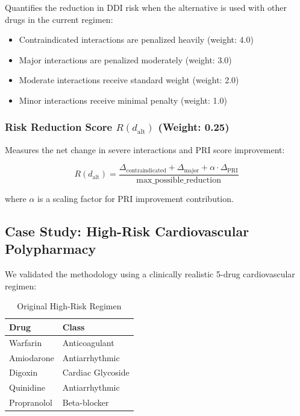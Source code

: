 \documentclass[11pt,a4paper]{article}
\begin{document}
Quantifies the reduction in DDI risk when the alternative is used with other drugs in the current regimen:

\begin{itemize}
    \item Contraindicated interactions are penalized heavily (weight: 4.0)
    \item Major interactions are penalized moderately (weight: 3.0)
    \item Moderate interactions receive standard weight (weight: 2.0)
    \item Minor interactions receive minimal penalty (weight: 1.0)
\end{itemize}

\subsubsection*{Risk Reduction Score $R(d_{\text{alt}})$ (Weight: 0.25)}

Measures the net change in severe interactions and PRI score improvement:

\begin{equation}
R(d_{\text{alt}}) = \frac{\Delta_{\text{contraindicated}} + \Delta_{\text{major}} + \alpha \cdot \Delta_{\text{PRI}}}{\text{max\_possible\_reduction}}
\end{equation}

where $\alpha$ is a scaling factor for PRI improvement contribution.

\subsection*{Case Study: High-Risk Cardiovascular Polypharmacy}

We validated the methodology using a clinically realistic 5-drug cardiovascular regimen:

\begin{table}[H]
\centering
\caption{Original High-Risk Regimen}
\label{tab:original_regimen}
\begin{tabular}{ll}
\toprule
\textbf{Drug} & \textbf{Class} \\
\midrule
Warfarin & Anticoagulant \\
Amiodarone & Antiarrhythmic \\
Digoxin & Cardiac Glycoside \\
Quinidine & Antiarrhythmic \\
Propranolol & Beta-blocker \\
\bottomrule
\end{tabular}
\end{table}
\end{document}
